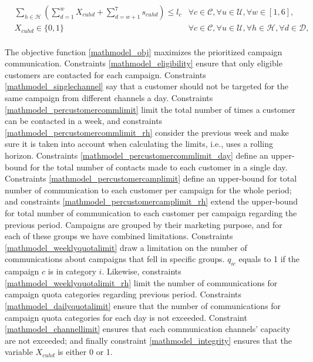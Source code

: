 \documentclass[11pt]{article}
\begin{document}
\begin{align}
&\sum\limits_{h\in\mathcal{H}}\left( \sum_{d=1}^{w}X_{{c}{u}{h}{d}} + \sum_{d=w+1}^{7}s_{{c}{u}{h}{d}}\right) \leq l_{c} &\forall c \in \mathcal{C}, \forall u \in \mathcal{U}, \forall w \in [1,6], \label{mathmodel_percustomercamplimit_rh}&\\
&X_{{c}{u}{h}{d}} \in \{0,1\}&\forall c \in \mathcal{C}, \forall u \in \mathcal{U}, \forall h \in \mathcal{H}, \forall d \in \mathcal{D}, \label{mathmodel_integrity}
\end{align}\\

The objective function \eqref{mathmodel_obj} maximizes the prioritized campaign communication. Constraints \eqref{mathmodel_eligibility} ensure that only eligible customers are contacted for each campaign. Constraints \eqref{mathmodel_singlechannel} say that a customer should not be targeted for the same campaign from different channels a day. Constraints \eqref{mathmodel_percustomercommlimit} limit the total number of times a customer can be contacted in a week, and constraints \eqref{mathmodel_percustomercommlimit_rh} consider the previous week and make sure it is taken into account when calculating the limits, i.e., uses a rolling horizon. Constraints \eqref{mathmodel_percustomercommlimit_day} define an upper-bound for the total number of contacts made to each customer in a single day. Constraints \eqref{mathmodel_percustomercamplimit} define an upper-bound for total number of communication to each customer per campaign for the whole period; and constraints \eqref{mathmodel_percustomercamplimit_rh} extend the upper-bound for total number of communication to each customer per campaign regarding the previous period. Campaigns are grouped by their marketing purpose, and for each of these groups we have combined limitations. Constraints \eqref{mathmodel_weeklyquotalimit} draw a limitation on the number of communications about campaigns that fell in specific groups. $q_{{i}{c}}$ equals to 1 if the campaign $c$ is in category  $i$. Likewise, constraints \eqref{mathmodel_weeklyquotalimit_rh} limit the number of communications for campaign quota categories regarding previous period. Constraints \eqref{mathmodel_dailyquotalimit} ensure that the number of communications for campaign quota categories for each day is not exceeded. Constraint \eqref{mathmodel_channellimit} ensures that each communication channels' capacity are not exceeded; and finally constraint \eqref{mathmodel_integrity} ensures that the variable $X_{{c}{u}{h}{d}}$ is either 0 or 1.\\
\end{document}
